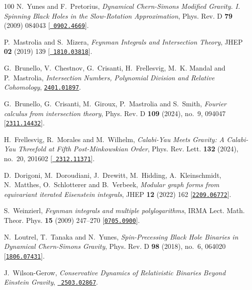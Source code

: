 \begin{thebibliography}{100}
N.~Yunes and F.~Pretorius,  {\em {Dynamical Chern-Simons Modified Gravity. I.
  Spinning Black Holes in the Slow-Rotation Approximation}}, Phys. Rev. D {\bf
  79} (2009) 084043 [\href{http://www.arXiv.org/abs/0902.4669}{{\tt
  0902.4669}}].

P.~Mastrolia and S.~Mizera,  {\em {Feynman Integrals and Intersection Theory}},
  JHEP {\bf 02} (2019) 139 [\href{http://www.arXiv.org/abs/1810.03818}{{\tt
  1810.03818}}].

G.~Brunello, V.~Chestnov, G.~Crisanti, H.~Frellesvig, M.~K. Mandal and
  P.~Mastrolia,  {\em {Intersection Numbers, Polynomial Division and Relative
  Cohomology}}, \href{http://www.arXiv.org/abs/2401.01897}{{\tt 2401.01897}}.

G.~Brunello, G.~Crisanti, M.~Giroux, P.~Mastrolia and S.~Smith,  {\em {Fourier
  calculus from intersection theory}}, Phys. Rev. D {\bf 109} (2024), no.~9,
  094047 [\href{http://www.arXiv.org/abs/2311.14432}{{\tt 2311.14432}}].

H.~Frellesvig, R.~Morales and M.~Wilhelm,  {\em {Calabi-Yau Meets Gravity: A
  Calabi-Yau Threefold at Fifth Post-Minkowskian Order}}, Phys. Rev. Lett. {\bf
  132} (2024), no.~20, 201602 [\href{http://www.arXiv.org/abs/2312.11371}{{\tt
  2312.11371}}].

D.~Dorigoni, M.~Doroudiani, J.~Drewitt, M.~Hidding, A.~Kleinschmidt,
  N.~Matthes, O.~Schlotterer and B.~Verbeek,  {\em {Modular graph forms from
  equivariant iterated Eisenstein integrals}}, JHEP {\bf 12} (2022) 162
  [\href{http://www.arXiv.org/abs/2209.06772}{{\tt 2209.06772}}].

S.~Weinzierl,  {\em {Feynman integrals and multiple polylogarithms}}, IRMA
  Lect. Math. Theor. Phys. {\bf 15} (2009) 247--270
  [\href{http://www.arXiv.org/abs/0705.0900}{{\tt 0705.0900}}].

N.~Loutrel, T.~Tanaka and N.~Yunes,  {\em {Spin-Precessing Black Hole Binaries
  in Dynamical Chern-Simons Gravity}}, Phys. Rev. D {\bf 98} (2018), no.~6,
  064020 [\href{http://www.arXiv.org/abs/1806.07431}{{\tt 1806.07431}}].

J.~Wilson-Gerow,  {\em {Conservative Dynamics of Relativistic Binaries Beyond
  Einstein Gravity}}, \href{http://www.arXiv.org/abs/2503.02867}{{\tt
  2503.02867}}.


\end{thebibliography}
